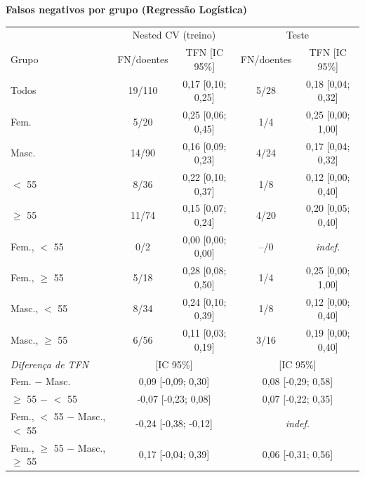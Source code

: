 \documentclass[10pt,a4paper]{article}
\newcommand{\nota}[1]{\par\vspace{1pt}{\scriptsize #1\par}\vspace{3pt}}
\begin{document}
\begin{paracol}{2}
\vspace{4pt}
{\footnotesize\bfseries Falsos negativos por grupo (Regressão Logística)}\par\vspace{1pt}
{\footnotesize \begin{tabular}{@{}l c c c c@{}}
\toprule
 & \multicolumn{2}{c}{Nested CV (treino)} & \multicolumn{2}{c}{Teste} \\
\cmidrule(lr){2-3}\cmidrule(l){4-5}
Grupo & FN/doentes & TFN [IC 95\%] & FN/doentes & TFN [IC 95\%] \\
\midrule
Todos & 19/110 & 0,17 [0,10; 0,25] & 5/28 & 0,18 [0,04; 0,32] \\
\addlinespace[1.5pt]
Fem. & 5/20 & 0,25 [0,06; 0,45] & 1/4 & 0,25 [0,00; 1,00] \\
Masc. & 14/90 & 0,16 [0,09; 0,23] & 4/24 & 0,17 [0,04; 0,32] \\
\addlinespace[1.5pt]
$<$ 55 & 8/36 & 0,22 [0,10; 0,37] & 1/8 & 0,12 [0,00; 0,40] \\
$\geq$ 55 & 11/74 & 0,15 [0,07; 0,24] & 4/20 & 0,20 [0,05; 0,40] \\
\addlinespace[1.5pt]
Fem., $<$ 55 & 0/2 & 0,00 [0,00; 0,00] & --/0 & \textit{indef.} \\
Fem., $\geq$ 55 & 5/18 & 0,28 [0,08; 0,50] & 1/4 & 0,25 [0,00; 1,00] \\
Masc., $<$ 55 & 8/34 & 0,24 [0,10; 0,39] & 1/8 & 0,12 [0,00; 0,40] \\
Masc., $\geq$ 55 & 6/56 & 0,11 [0,03; 0,19] & 3/16 & 0,19 [0,00; 0,40] \\
\midrule
\textit{Diferença de TFN} & \multicolumn{2}{c}{[IC 95\%]} & \multicolumn{2}{c}{[IC 95\%]} \\
Fem. $-$ Masc. & \multicolumn{2}{c}{0,09 [-0,09; 0,30]} & \multicolumn{2}{c}{0,08 [-0,29; 0,58]} \\
$\geq$ 55 $-$ $<$ 55 & \multicolumn{2}{c}{-0,07 [-0,23; 0,08]} & \multicolumn{2}{c}{0,07 [-0,22; 0,35]} \\
Fem., $<$ 55 $-$ Masc., $<$ 55 & \multicolumn{2}{c}{-0,24 [-0,38; -0,12]} & \multicolumn{2}{c}{\textit{indef.}} \\
Fem., $\geq$ 55 $-$ Masc., $\geq$ 55 & \multicolumn{2}{c}{0,17 [-0,04; 0,39]} & \multicolumn{2}{c}{0,06 [-0,31; 0,56]} \\
\bottomrule
\end{tabular}}
\nota{FN: pacientes com doença classificados como sem doença; TFN = FN/doentes. Diferença de TFN entre grupos do mesmo fator: 0 corresponde à Igualdade de Oportunidade; IC 95\% por bootstrap. indef.: grupo sem doentes. Com apenas 2 doentes em Fem., $<$ 55, o IC desse grupo e o da sua diferença não são confiáveis.}

\end{paracol}
\end{document}
